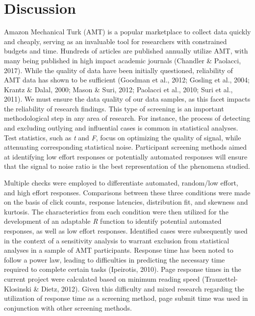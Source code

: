 \documentclass[english,man]{apa6}
\theoremstyle{definition}
\theoremstyle{definition}
\theoremstyle{definition}
\theoremstyle{remark}
\begin{document}
\section{Discussion}\label{discussion}

Amazon Mechanical Turk (AMT) is a popular marketplace to collect data
quickly and cheaply, serving as an invaluable tool for researchers with
constrained budgets and time. Hundreds of articles are published
annually utilize AMT, with many being published in high impact academic
journals (Chandler \& Paolacci, 2017). While the quality of data have
been initially questioned, reliability of AMT data has shown to be
sufficient (Goodman et al., 2012; Gosling et al., 2004; Krantz \& Dalal,
2000; Mason \& Suri, 2012; Paolacci et al., 2010; Suri et al., 2011). We
must ensure the data quality of our data samples, as this facet impacts
the reliability of research findings. This type of screening is an
important methodological step in any area of research. For instance, the
process of detecting and excluding outlying and influential cases is
common in statistical analyses. Test statistics, such as \emph{t} and
\emph{F}, focus on optimizing the quality of signal, while attenuating
corresponding statistical noise. Participant screening methods aimed at
identifying low effort responses or potentially automated responses will
ensure that the signal to noise ratio is the best representation of the
phenomena studied.

Multiple checks were employed to differentiate automated, random/low
effort, and high effort responses. Comparisons between these three
conditions were made on the basis of click counts, response latencies,
distribution fit, and skewness and kurtosis. The characteristics from
each condition were then utilized for the development of an adaptable
\emph{R} function to identify potential automated responses, as well as
low effort responses. Identified cases were subsequently used in the
context of a sensitivity analysis to warrant exclusion from statistical
analyses in a sample of AMT participants. Response time has been noted
to follow a power law, leading to difficulties in predicting the
necessary time required to complete certain tasks (Ipeirotis, 2010).
Page response times in the current project were calculated based on
minimum reading speed (Trauzettel-Klosinski \& Dietz, 2012). Given this
difficulty and mixed research regarding the utilization of response time
as a screening method, page submit time was used in conjunction with
other screening methods.
\end{document}
